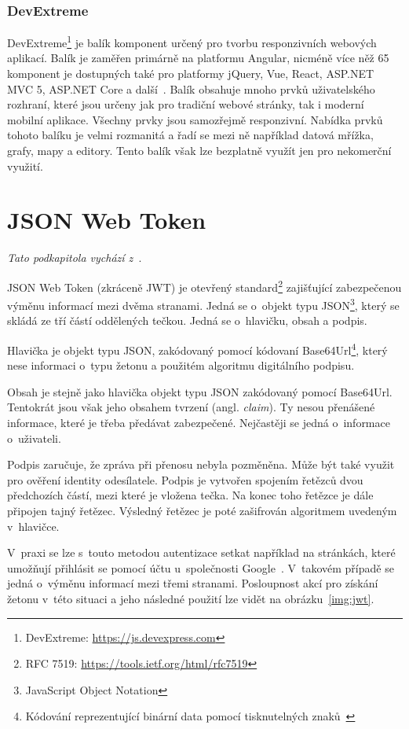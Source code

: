 \subsubsection{DevExtreme}
DevExtreme\footnote{DevExtreme: \url{https://js.devexpress.com}} je balík komponent určený pro tvorbu responzivních webových aplikací. Balík je zaměřen primárně na platformu Angular, nicméně více něž 65 komponent je dostupných také pro platformy jQuery, Vue, React, ASP.NET MVC 5, ASP.NET Core a další~\cite{bib:devextreme}. Balík obsahuje mnoho prvků uživatelského rozhraní, které jsou určeny jak pro tradiční webové stránky, tak i moderní mobilní aplikace. Všechny prvky jsou samozřejmě responzivní. Nabídka prvků tohoto balíku je velmi rozmanitá a řadí se mezi ně například datová mřížka, grafy, mapy a editory. Tento balík však lze bezplatně využít jen pro nekomerční využití.

\section{JSON Web Token}
\emph{Tato podkapitola vychází z~\cite{bib:jwt}}.

JSON Web Token (zkráceně JWT) je otevřený standard\footnote{RFC 7519: \url{https://tools.ietf.org/html/rfc7519}} zajišťující zabezpečenou výměnu informací mezi dvěma stranami. Jedná se o~objekt typu JSON\footnote{JavaScript Object Notation}, který se skládá ze tří částí oddělených tečkou. Jedná se o~hlavičku, obsah a podpis.

Hlavička je objekt typu JSON, zakódovaný pomocí kódovaní Base64Url\footnote{Kódování reprezentující binární data pomocí tisknutelných znaků~\cite{bib:base64}}, který nese informaci o~typu žetonu a použitém algoritmu digitálního podpisu. 

Obsah je stejně jako hlavička objekt typu JSON zakódovaný pomocí Base64Url. Tentokrát jsou však jeho obsahem tvrzení (angl. \emph{claim}). Ty nesou přenášené informace, které je třeba předávat zabezpečené. Nejčastěji se jedná o~informace o~uživateli.

Podpis zaručuje, že zpráva při přenosu nebyla pozměněna. Může být také využit pro ověření identity odesílatele. Podpis je vytvořen spojením řetězců dvou předchozích částí, mezi které je vložena tečka. Na konec toho řetězce je dále připojen tajný řetězec. Výsledný řetězec je poté zašifrován algoritmem uvedeným v~hlavičce. 

V~praxi se lze s~touto metodou autentizace setkat například na stránkách, které umožňují přihlásit se pomocí účtu u~společnosti Google~\cite{bib:google-jwt}. V~takovém případě se jedná o~výměnu informací mezi třemi stranami. Posloupnost akcí pro získání žetonu v~této situaci a jeho následné použití lze vidět na obrázku~\ref{img:jwt}.

